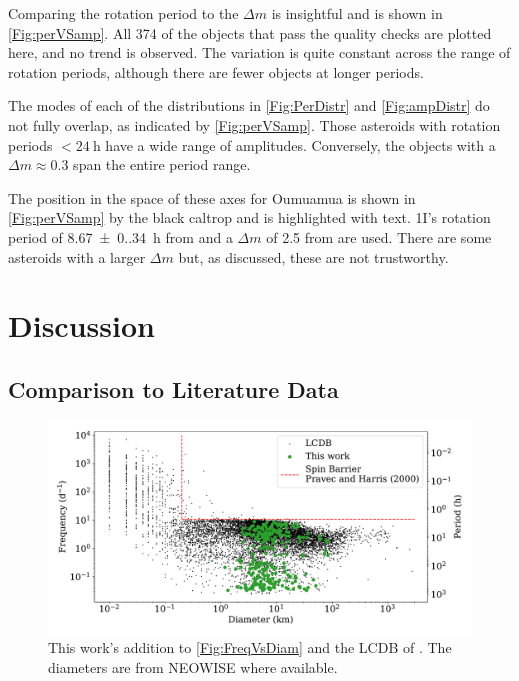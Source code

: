 \documentclass{UCreport}
\DeclareRobustCommand{\okina}{%
  \raisebox{\dimexpr\fontcharht\font`A-\height}{%
    \scalebox{0.8}{`}%
  }%
}
\newcommand{\omuamua}{\okina Oumuamua } %
\begin{document}
Comparing the rotation period to the $\Delta m$ is insightful and is shown in \autoref{Fig:perVSamp}.
All 374 of the objects that pass the quality checks are plotted here, and no trend is observed.
The variation is quite constant across the range of rotation periods, although there are fewer objects at longer periods.

The modes of each of the distributions in \autoref{Fig:PerDistr} and \autoref{Fig:ampDistr} do not fully overlap, as indicated by \autoref{Fig:perVSamp}.
Those asteroids with rotation periods $<\qty{24}{\hour}$ have a wide range of amplitudes.
Conversely, the objects with a $\Delta m \approx 0.3$ span the entire period range.

The position in the space of these axes for \omuamua is shown in \autoref{Fig:perVSamp} by the black caltrop and is highlighted with text.
1I's rotation period of \qty{8.67(0.34)}{\hour} from \citet{Belton2018} and a $\Delta m$ of \qty{2.5}{\mag} from \citet{Meech2017} are used.
There are some asteroids with a larger $\Delta m$ but, as discussed, these are not trustworthy.


\section{Discussion}\label{Sec:Disc}

\subsection{Comparison to Literature Data}\label{SubSec:LitComp}

\begin{figure}
  \centering
  \includegraphics[width=\textwidth]{./Figures/Diam-FreqPlotThisWork.pdf}
  \caption[\autoref{Fig:FreqVsDiam} updated by this work and NEOWISE]{This work's addition to \autoref{Fig:FreqVsDiam} and the LCDB of \citet{Warner2009}. The diameters are from NEOWISE where available.}
  \label{Fig:FreqDiamUpdate}
\end{figure}
\end{document}
